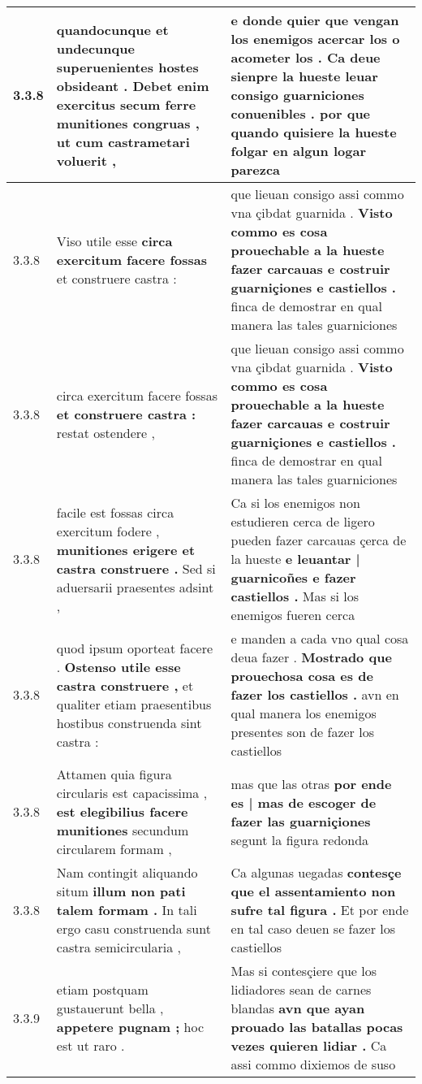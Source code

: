 \begin{tabular}{|p{1cm}|p{6.5cm}|p{6.5cm}|}
3.3.8 & quandocunque et undecunque superuenientes hostes obsideant . \textbf{ Debet enim exercitus secum ferre munitiones congruas , } ut cum castrametari voluerit , & e donde quier que vengan los enemigos acercar los o acometer los . \textbf{ Ca deue sienpre la hueste leuar consigo guarniciones conuenibles . } por que quando quisiere la hueste folgar en algun logar parezca \\\hline
3.3.8 & Viso utile esse \textbf{ circa exercitum facere fossas } et construere castra : & que lieuan consigo assi commo vna çibdat guarnida . \textbf{ Visto commo es cosa prouechable a la hueste fazer carcauas e costruir guarniçiones e castiellos . } finca de demostrar en qual manera las tales guarniciones \\\hline
3.3.8 & circa exercitum facere fossas \textbf{ et construere castra : } restat ostendere , & que lieuan consigo assi commo vna çibdat guarnida . \textbf{ Visto commo es cosa prouechable a la hueste fazer carcauas e costruir guarniçiones e castiellos . } finca de demostrar en qual manera las tales guarniciones \\\hline
3.3.8 & facile est fossas circa exercitum fodere , \textbf{ munitiones erigere et castra construere . } Sed si aduersarii praesentes adsint , & Ca si los enemigos non estudieren cerca de ligero pueden fazer carcauas çerca de la hueste \textbf{ e leuantar | guarnicoñes e fazer castiellos . } Mas si los enemigos fueren cerca \\\hline
3.3.8 & quod ipsum oporteat facere . \textbf{ Ostenso utile esse castra construere , } et qualiter etiam praesentibus hostibus construenda sint castra : & e manden a cada vno qual cosa deua fazer . \textbf{ Mostrado que prouechosa cosa es de fazer los castiellos . } avn en qual manera los enemigos presentes son de fazer los castiellos \\\hline
3.3.8 & Attamen quia figura circularis est capacissima , \textbf{ est elegibilius facere munitiones } secundum circularem formam , & mas que las otras \textbf{ por ende es | mas de escoger de fazer las guarniçiones } segunt la figura redonda \\\hline
3.3.8 & Nam contingit aliquando situm \textbf{ illum non pati talem formam . } In tali ergo casu construenda sunt castra semicircularia , & Ca algunas uegadas \textbf{ contesçe que el assentamiento non sufre tal figura . } Et por ende en tal caso deuen se fazer los castiellos \\\hline
3.3.9 & etiam postquam gustauerunt bella , \textbf{ appetere pugnam ; } hoc est ut raro . & Mas si contesçiere que los lidiadores sean de carnes blandas \textbf{ avn que ayan prouado las batallas pocas vezes quieren lidiar . } Ca assi commo dixiemos de suso \\\hline

\end{tabular}
